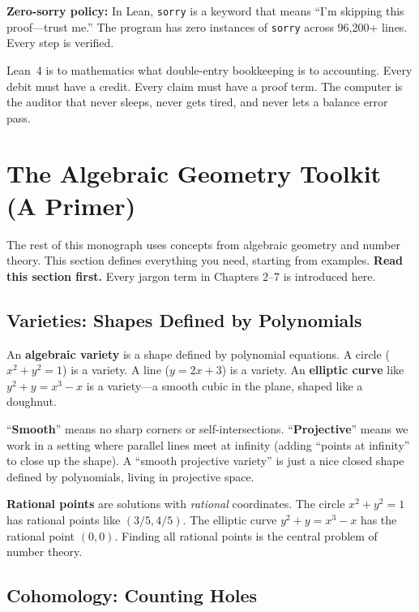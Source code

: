 \documentclass[11pt,twoside,openany]{report}
\theoremstyle{remark}
\begin{document}
\textbf{Zero-sorry policy:} In Lean, \texttt{sorry} is a keyword that means ``I'm skipping this proof---trust me.'' The program has zero instances of \texttt{sorry} across 96,200+ lines. Every step is verified.

\begin{analogybox}
Lean~4 is to mathematics what double-entry bookkeeping is to accounting. Every debit must have a credit. Every claim must have a proof term. The computer is the auditor that never sleeps, never gets tired, and never lets a balance error pass.
\end{analogybox}

\section{The Algebraic Geometry Toolkit (A Primer)}

The rest of this monograph uses concepts from algebraic geometry and number theory. This section defines everything you need, starting from examples. \textbf{Read this section first.} Every jargon term in Chapters 2--7 is introduced here.

\subsection*{Varieties: Shapes Defined by Polynomials}

An \textbf{algebraic variety} is a shape defined by polynomial equations. A circle ($x^2 + y^2 = 1$) is a variety. A line ($y = 2x + 3$) is a variety. An \textbf{elliptic curve} like $y^2 + y = x^3 - x$ is a variety---a smooth cubic in the plane, shaped like a doughnut.

``\textbf{Smooth}'' means no sharp corners or self-intersections. ``\textbf{Projective}'' means we work in a setting where parallel lines meet at infinity (adding ``points at infinity'' to close up the shape). A ``smooth projective variety'' is just a nice closed shape defined by polynomials, living in projective space.

\textbf{Rational points} are solutions with \emph{rational} coordinates. The circle $x^2 + y^2 = 1$ has rational points like $(3/5, 4/5)$. The elliptic curve $y^2 + y = x^3 - x$ has the rational point $(0, 0)$. Finding all rational points is the central problem of number theory.

\subsection*{Cohomology: Counting Holes}
\end{document}
